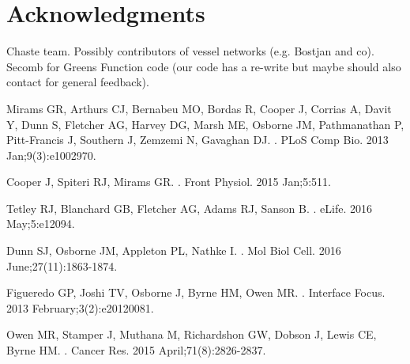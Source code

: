 \documentclass[10pt,letterpaper]{article}
\begin{document}
\section*{Acknowledgments}
Chaste team. Possibly contributors of vessel networks (e.g. Bostjan and co). Secomb for Greens Function code (our code has a re-write but maybe should also contact for general feedback).

\nolinenumbers

%
%
% 
\begin{thebibliography}{10}

Mirams GR, Arthurs CJ, Bernabeu MO, Bordas R, Cooper J, Corrias A, Davit Y, Dunn S, Fletcher AG, Harvey DG, Marsh ME, Osborne JM, Pathmanathan P, Pitt-Francis J, Southern J, Zemzemi N, Gavaghan DJ.
.
\newblock PLoS Comp Bio. 2013 Jan;9(3):e1002970.

Cooper J, Spiteri RJ, Mirams GR.
.
\newblock Front Physiol. 2015 Jan;5:511.

Tetley RJ, Blanchard GB, Fletcher AG, Adams RJ, Sanson B.
.
\newblock eLife. 2016 May;5:e12094.

Dunn SJ, Osborne JM, Appleton PL, Nathke I.
.
\newblock Mol Biol Cell. 2016 June;27(11):1863-1874.

Figueredo GP, Joshi TV, Osborne J, Byrne HM, Owen MR.
.
\newblock Interface Focus. 2013 February;3(2):e20120081.

Owen MR, Stamper J, Muthana M, Richardshon GW, Dobson J, Lewis CE, Byrne HM.
.
\newblock Cancer Res. 2015 April;71(8):2826-2837.


\end{thebibliography}
\end{document}
